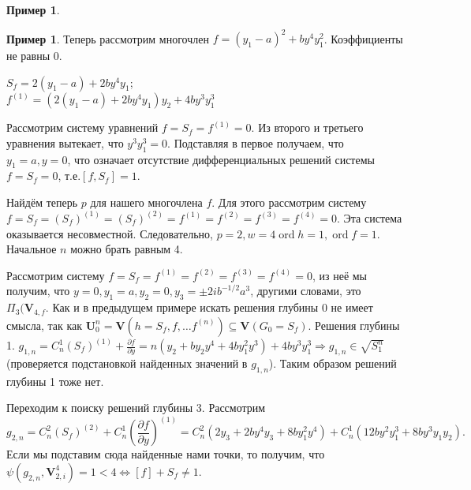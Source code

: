 \documentclass[16pt]{article}
\DeclareMathOperator{\ord}{ord}
\theoremstyle{plain1}
\theoremstyle{plain2}
\theoremstyle{plain}
\theoremstyle{plain3}
\theoremstyle{definition}
\newtheorem{example}[theorem3]{Пример}
\theoremstyle{remark}
\begin{document}
\begin{example}
\end{example}



\begin{example}
 Теперь рассмотрим многочлен $f =
(y_1-a)^2+by^4y_1^2$. Коэффициенты не равны 0.

$S_f=2(y_1-a)+2by^4y_1$;
\\
$f^{(1)}=(2(y_1-a)+2by^4y_1)y_2+4by^3y_1^3$

Рассмотрим систему уравнений $f=S_f=f^{(1)}=0$. Из второго и
третьего уравнения вытекает, что $y^3y_1^3=0$. Подставляя в первое
получаем, что $y_1=a, y=0$, что означает отсутствие дифференциальных
решений системы $f=S_f=0$, т.е.$[f,S_f]=1$.

Найдём теперь  $p$ для нашего многочлена $f$. Для этого рассмотрим
систему $f=S_f=(S_f)^{(1)}=(S_f)^{(2)}=f^{(1)}=f^{(2)}=f^{(3)}=f^{(4)}=0$. Эта система оказывается несовместной. Следовательно,
$p=2,w=4\ord{h}=1,\ord{f}=1$. Начальное $n$  можно брать равным 4.

Рассмотрим систему $f=S_f=f^{(1)}=f^{(2)}=f^{(3)}=f^{(4)}=0$, из неё мы получим, что $y=0,y_1=a,y_2=0,y_3=\pm2ib^{-1/2}a^3$, другими словами, это $\Pi_3(\mathbf{V}_{4,f}$. 
Как и в предыдущем примере искать решения глубины 0 не имеет смысла, так как $\mathbf{U}_0^n = \mathbf{V}(h=S_f,f,\ldots f^{(n)})\subseteq\mathbf{V}(G_0=S_f)$.  Решения глубины 1. $g_{1,n}=C_n^1(S_f)^{(1)}+\frac{\partial f}{\partial y}=n(y_2+by_2y^4+4by_1^2y^3)+4by^3y_1^3\Rightarrow g_{1,n}\in\sqrt{S_1^n}$ (проверяется подстановкой найденных значений в $g_{1,n}$).  Таким образом решений глубины 1 тоже нет.

Переходим к поиску решений глубины 3. Рассмотрим $$g_{2,n}=C_n^2(S_f)^{(2)}+C_n^1\left(\frac{\partial
f}{\partial
y}\right)^{(1)}=C_n^2(2y_3+2by^4y_3+8by_1^2y^4)+C_n^1(12by^2y_1^3+8by^3y_1y_2).$$
Если мы подставим сюда найденные нами точки, то получим, что
$\psi(g_{2,n},\mathbf{V}_{2,i}^4)= 1 <4\Leftrightarrow [f]+S_f\not=1.$


\end{example}
\end{document}
